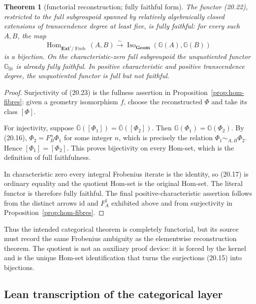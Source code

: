 \documentclass[11pt,oneside]{article}
\newtheorem{theorem}{Theorem}[section]
\theoremstyle{definition}
\theoremstyle{remark}
\newcommand{\Frob}{\operatorname{Frob}}
\begin{document}
\begin{theorem}[functorial reconstruction; fully faithful form]
\label{thm:functorial-reconstruction}
The functor (20.22), restricted to the full subgroupoid spanned by relatively
algebraically closed extensions of transcendence degree at least five, is fully faithful:
for every such $A,B$, the map
\[
 \operatorname{Hom}_{\mathbf{Ext}^{i}/\Frob}(A,B)
 \overset{\sim}{\longrightarrow}
 \operatorname{Iso}_{\mathbf{Geom}}
   (\mathbb G(A),\mathbb G(B))                                \tag{20.23}
\]
is a bijection.  On the characteristic-zero full subgroupoid the unquotiented functor
$\mathbb G_{\mathrm{lit}}$ is already fully faithful.  In positive characteristic and
positive transcendence degree, the unquotiented functor is full but not faithful.
\end{theorem}
\begin{proof}
Surjectivity of (20.23) is the fullness assertion in
Proposition~\ref{prop:hom-fibres}: given a geometry isomorphism $f$, choose the reconstructed
$\Phi$ and take its class $[\Phi]$.

For injectivity, suppose
$\overline{\mathbb G}([\Phi_1])=\overline{\mathbb G}([\Phi_2])$.
Then $\mathbb G(\Phi_1)=\mathbb G(\Phi_2)$.  By (20.16),
$\Phi_2=F_B^n\Phi_1$ for some integer $n$, which is precisely the relation
$\Phi_1\sim_{A,B}\Phi_2$.  Hence $[\Phi_1]=[\Phi_2]$.  This proves bijectivity on every
Hom-set, which is the definition of full faithfulness.

In characteristic zero every integral Frobenius iterate is the identity, so (20.17) is
ordinary equality and the quotient Hom-set is the original Hom-set.  The literal functor
is therefore fully faithful.  The final positive-characteristic assertion follows from
the distinct arrows $\mathrm{id}$ and $F_A^1$ exhibited above and from surjectivity in
Proposition~\ref{prop:hom-fibres}.
\end{proof}

Thus the intended categorical theorem is completely functorial, but its source must record
the same Frobenius ambiguity as the elementwise reconstruction theorem.  The quotient is
not an auxiliary proof device: it is forced by the kernel and is the unique Hom-set
identification that turns the surjections (20.15) into bijections.

\subsection{Lean transcription of the categorical layer}
\end{document}
